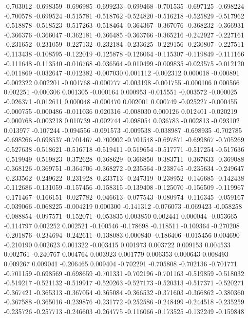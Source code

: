 -0.703012
-0.698359
-0.696985
-0.699233
-0.699468
-0.701535
-0.697125
-0.698224
-0.700578
-0.699524
-0.515781
-0.518762
-0.524820
-0.516218
-0.525829
-0.517962
-0.518878
-0.518523
-0.517263
-0.518464
-0.364367
-0.367076
-0.368232
-0.366931
-0.366376
-0.366047
-0.362181
-0.366485
-0.363766
-0.365216
-0.242927
-0.227161
-0.231652
-0.231059
-0.227132
-0.232184
-0.233625
-0.229156
-0.230807
-0.227511
-0.113438
-0.108595
-0.122019
-0.125878
-0.126064
-0.115307
-0.119849
-0.111166
-0.111648
-0.113540
-0.016768
-0.036564
-0.010499
-0.009835
-0.023575
-0.012120
-0.011869
-0.032647
-0.012382
-0.007030
0.001112
-0.002312
0.000018
-0.000891
-0.002322
0.002201
-0.001768
-0.000777
-0.003198
-0.001755
-0.000106
0.000566
0.002251
-0.000306
0.001305
-0.000164
0.000953
-0.015551
-0.003572
-0.000025
-0.026371
-0.012611
0.000048
-0.000470
0.002001
0.000749
-0.025227
-0.000455
-0.000755
-0.000486
-0.011036
0.020316
-0.008030
0.000126
0.012401
-0.020219
-0.000768
-0.003218
0.010739
-0.002744
-0.098054
0.036783
-0.002813
-0.093102
0.013977
-0.107244
-0.094556
-0.091573
-0.009538
-0.038987
-0.698935
-0.702785
-0.698266
-0.698537
-0.701467
-0.700902
-0.701548
-0.697871
-0.699867
-0.705269
-0.527638
-0.518621
-0.516718
-0.519411
-0.519654
-0.517771
-0.517254
-0.517636
-0.519949
-0.519823
-0.372628
-0.368629
-0.366850
-0.383711
-0.367633
-0.369088
-0.368126
-0.369751
-0.364706
-0.368272
-0.235564
-0.238745
-0.235634
-0.249647
-0.233562
-0.249622
-0.231928
-0.233713
-0.247319
-0.238952
-0.146685
-0.142438
-0.112686
-0.131059
-0.157456
-0.158315
-0.139408
-0.125070
-0.156509
-0.119967
-0.171467
-0.166151
-0.027782
-0.046613
-0.077543
-0.080974
-0.116345
-0.059167
-0.039066
-0.068225
-0.004219
0.000300
-0.141312
-0.076073
-0.069423
-0.058258
-0.088854
-0.097571
-0.152071
-0.053835
0.003850
0.002441
0.000044
-0.053665
-0.114797
0.002252
0.002521
-0.100546
-0.178698
-0.118511
-0.109364
-0.270208
-0.201876
-0.234694
-0.242611
-0.138083
0.000840
-0.186406
-0.015456
0.004690
-0.210190
0.002623
0.001322
-0.003415
0.001973
0.003722
0.009153
0.004533
0.002761
-0.240767
0.004764
0.003923
0.001779
0.006353
0.000643
0.008493
0.009267
0.009041
-0.206465
0.009404
-0.702291
-0.705808
-0.702136
-0.701771
-0.701159
-0.698569
-0.698659
-0.701331
-0.702196
-0.701163
-0.519859
-0.518032
-0.519217
-0.521132
-0.519917
-0.520263
-0.527173
-0.520313
-0.517371
-0.520271
-0.367421
-0.365313
-0.367054
-0.365084
-0.366532
-0.371603
-0.366862
-0.380360
-0.367588
-0.365016
-0.239876
-0.231772
-0.252586
-0.248499
-0.244518
-0.235259
-0.235726
-0.257713
-0.246603
-0.264775
-0.116066
-0.173525
-0.132249
-0.159848
